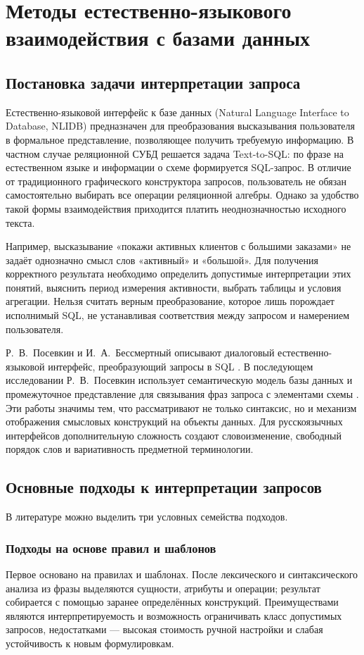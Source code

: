 \clearpage
\section{Методы естественно-языкового взаимодействия с базами данных}
\subsection{Постановка задачи интерпретации запроса}

Естественно-языковой интерфейс к базе данных (Natural Language Interface to Database, NLIDB) предназначен для преобразования высказывания пользователя в формальное представление, позволяющее получить требуемую информацию. В частном случае реляционной СУБД решается задача Text-to-SQL: по фразе на естественном языке и информации о схеме формируется SQL-запрос. В отличие от традиционного графического конструктора запросов, пользователь не обязан самостоятельно выбирать все операции реляционной алгебры. Однако за удобство такой формы взаимодействия приходится платить неоднозначностью исходного текста.

Например, высказывание «покажи активных клиентов с большими заказами» не задаёт однозначно смысл слов «активный» и «большой». Для получения корректного результата необходимо определить допустимые интерпретации этих понятий, выяснить период измерения активности, выбрать таблицы и условия агрегации. Нельзя считать верным преобразование, которое лишь порождает исполнимый SQL, не устанавливая соответствия между запросом и намерением пользователя.

Р.~В.~Посевкин и И.~А.~Бессмертный описывают диалоговый естественно-языковой интерфейс, преобразующий запросы в SQL \cite{posevkin2016}. В последующем исследовании Р.~В.~Посевкин использует семантическую модель базы данных и промежуточное представление для связывания фраз запроса с элементами схемы \cite{posevkin2018}. Эти работы значимы тем, что рассматривают не только синтаксис, но и механизм отображения смысловых конструкций на объекты данных. Для русскоязычных интерфейсов дополнительную сложность создают словоизменение, свободный порядок слов и вариативность предметной терминологии.

\subsection{Основные подходы к интерпретации запросов}

В литературе можно выделить три условных семейства подходов.\par\subsubsection{Подходы на основе правил и шаблонов}\par Первое основано на правилах и шаблонах. После лексического и синтаксического анализа из фразы выделяются сущности, атрибуты и операции; результат собирается с помощью заранее определённых конструкций. Преимуществами являются интерпретируемость и возможность ограничивать класс допустимых запросов, недостатками — высокая стоимость ручной настройки и слабая устойчивость к новым формулировкам.

